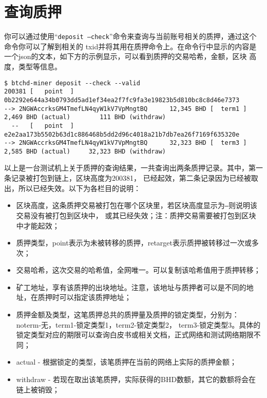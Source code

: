 \section{查询质押}
\begin{flushleft}
    你可以通过使用``\texttt{deposit --check}''命令来查询与当前账号相关的质押，通过这个命令你可以了解到相关的
    txid并将其用在质押命令上。在命令行中显示的内容是一个json的文本，如下方的示例显示，可以看到质押的交易哈希，金额，区块
    高度，类型等信息。
\end{flushleft}
\scriptsize
\begin{verbatim}
$ btchd-miner deposit --check --valid
200381 [   point  ] 0b2292e644a34b0793dd5ad1ef34ea2f7fc9fa3e19823b5d810bc8c8d46e7373
--> 2NGWAccrksGM4TmefLN4qyW1kV7VpMngtBQ      12,345 BHD [  term1 ]
2,469 BHD (actual)        111 BHD (withdraw)
  --   [   point  ] e2e2aa173b5502b63d1c886468b5dd2d96c4018a21b7db7ea26f7169f635320e
--> 2NGWAccrksGM4TmefLN4qyW1kV7VpMngtBQ      32,323 BHD [  term3 ]
2,585 BHD (actual)     32,323 BHD (withdraw)
\end{verbatim}
\normalsize
\begin{flushleft}
    以上是一台测试机上关于质押的查询结果，一共查询出两条质押记录。其中，第一条记录被打包到链上，区块高度为200381，
    已经起效，第二条记录因为已经被取出，所以已经失效。以下为各栏目的说明：
\end{flushleft}
\begin{itemize}
    \item 区块高度，这条质押交易被打包在哪个区块里，若区块高度显示为\texttt{---}则说明该交易没有被打包到区块中，
        或其已经失效；注：质押交易需要被打包到区块中才能起效；
    \item 质押类型，point表示为未被转移的质押，retarget表示质押被转移过一次或多次；
    \item 交易哈希，这次交易的哈希值，全网唯一。可以复制该哈希值用于质押转移；
    \item 矿工地址，享有该质押的出块地址。注意，该地址与质押者可以是不同的地址，在质押时可以指定该质押地址；
    \item 质押金额及类型，这笔质押总共的质押量及质押的锁定类型，分别为：noterm-无，term1-锁定类型1，term2-锁定类型2，
        term3-锁定类型3。具体的锁定类型对应的期限可以查询白皮书或相关文档，正式网络和测试网络期限不同；
    \item actual - 根据锁定的类型，该笔质押在当前的网络上实际的质押金额；
    \item withdraw - 若现在取出该笔质押，实际获得的BHD数额，其它的数额将会在链上被销毁；
\end{itemize}
